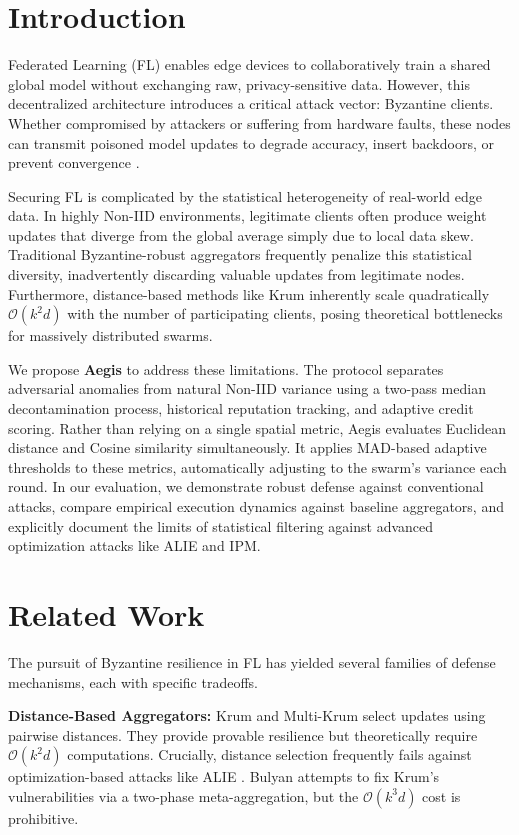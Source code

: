 \documentclass[10pt, conference]{IEEEtran}
\begin{document}
\section{Introduction}
Federated Learning (FL) enables edge devices to collaboratively train a shared global model without exchanging raw, privacy-sensitive data. However, this decentralized architecture introduces a critical attack vector: Byzantine clients. Whether compromised by attackers or suffering from hardware faults, these nodes can transmit poisoned model updates to degrade accuracy, insert backdoors, or prevent convergence \cite{blanchard2017}.

Securing FL is complicated by the statistical heterogeneity of real-world edge data. In highly Non-IID environments, legitimate clients often produce weight updates that diverge from the global average simply due to local data skew. Traditional Byzantine-robust aggregators frequently penalize this statistical diversity, inadvertently discarding valuable updates from legitimate nodes. Furthermore, distance-based methods like Krum inherently scale quadratically $\mathcal{O}(k^2 d)$ with the number of participating clients, posing theoretical bottlenecks for massively distributed swarms.

We propose \textbf{Aegis} to address these limitations. The protocol separates adversarial anomalies from natural Non-IID variance using a two-pass median decontamination process, historical reputation tracking, and adaptive credit scoring. Rather than relying on a single spatial metric, Aegis evaluates Euclidean distance and Cosine similarity simultaneously. It applies MAD-based adaptive thresholds to these metrics, automatically adjusting to the swarm's variance each round. In our evaluation, we demonstrate robust defense against conventional attacks, compare empirical execution dynamics against baseline aggregators, and explicitly document the limits of statistical filtering against advanced optimization attacks like ALIE and IPM.

\section{Related Work}
The pursuit of Byzantine resilience in FL has yielded several families of defense mechanisms, each with specific tradeoffs.

\textbf{Distance-Based Aggregators:} Krum and Multi-Krum \cite{blanchard2017} select updates using pairwise distances. They provide provable resilience but theoretically require $\mathcal{O}(k^2 d)$ computations. Crucially, distance selection frequently fails against optimization-based attacks like ALIE \cite{baruch2019}. Bulyan \cite{elmhamdi2018} attempts to fix Krum's vulnerabilities via a two-phase meta-aggregation, but the $\mathcal{O}(k^3 d)$ cost is prohibitive.
\end{document}
